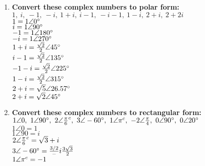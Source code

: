 \begin{enumerate}

\item{\bf Convert these complex numbers to polar form: \\ $1,\  i ,\  -1,\  -i,\  1+i,\  i-1,\  -i-1,\  1-i,\  2+i,\  2+2i$}\\

\tab \tab $1 = 1\angle0^\circ$\\

\tab \tab $i = 1\angle90^\circ$\\

\tab \tab $-1 = 1\angle180^\circ$\\

\tab \tab $-i = 1\angle270^\circ$\\

\tab \tab $1+i = \frac{\sqrt{2}}{2}\angle45^\circ$\\

\tab \tab $i-1 = \frac{\sqrt{2}}{2}\angle135^\circ$\\

\tab \tab $-1-i = \frac{\sqrt{2}}{2}\angle225^\circ$\\

\tab \tab $1-i = \frac{\sqrt{2}}{2}\angle315^\circ$\\

\tab \tab $2+i = \sqrt{5}\angle26.57^\circ$\\

\tab \tab $2+i = \sqrt{2}\angle45^\circ$\\

\item{\bf Convert these complex numbers to rectangular form: \\ $1\angle0,\   1\angle90^\circ,\  2\angle\frac{\pi}{6}^c,\   3\angle-60^\circ,\  1\angle\pi^c,\  -2\angle\frac{\pi}{4},\  0\angle90^\circ,\  0\angle20^\circ$}\\

\tab \tab $1\angle0 = 1$\\

\tab \tab $1\angle90 = i$\\

\tab \tab $2\angle\frac{\pi}{6}^c = \sqrt{3} + i$\\

\tab \tab $3\angle-60^\circ = \frac{3/2} - i\frac{3\sqrt{3}}{2}$\\

\tab \tab $1\angle\pi^c = -1$\\


\end{enumerate}
